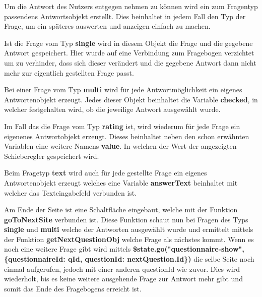 Um die Antwort des Nutzers entgegen nehmen zu können wird ein zum Fragentyp passendens Antwortsobjekt erstellt. Dies beinhaltet in jedem Fall den Typ der Frage, um ein späteres auswerten und anzeigen einfach zu machen.

Ist die Frage vom Typ  \textbf{single} wird in diesem Objekt die Frage und die gegebene Antwort gespeichert. Hier wurde auf eine Verbindung zum Fragebogen verzichtet um zu verhinder, dass sich dieser verändert und die gegebene Antwort dann nicht mehr zur eigentlich gestellten Frage passt.

Bei einer Frage vom Typ \textbf{multi} wird für jede Antwortmöglichkeit ein eigenes Antwortenobjekt erzeugt. Jedes dieser Objekt beinhaltet die Variable \textbf{checked}, in welcher festgehalten wird, ob die jeweilige Antwort ausgewählt wurde.

Im Fall das die Frage vom Typ \textbf{rating} ist, wird wiederum für jede Frage ein eigenenes Antwortobjekt erzeugt. Dieses beinhaltet neben den schon erwähnten Variablen eine weitere Namens \textbf{value}. In welchen der Wert der angezeigten Schieberegler gespeichert wird.

Beim Fragetyp \textbf{text} wird auch für jede gestellte Frage ein eigenes Antwortenobjekt erzeugt welches eine Variable \textbf{answerText} beinhaltet mit welcher das Texteingabefeld verbunden ist.

Am Ende der Seite ist eine Schaltfläche eingebaut, welche mit der Funktion \textbf{goToNextSite} verbunden ist.
Diese Funktion schaut nun bei Fragen des Typs \textbf{single} und \textbf{multi} welche der Antworten ausgewählt wurde und ermittelt mittels der Funktion \textbf{getNextQuestionObj} welche Frage als nächstes kommt. Wenn es noch eine weitere Frage gibt wird mittels \textbf{\$state.go("questionnaire-show",\{questionnaireId: qId, questionId: nextQuestion.Id\})} die selbe Seite noch einmal aufgerufen, jedoch mit einer anderen questionId wie zuvor.
Dies wird wiederholt, bis es keine weitere ausgehende Frage zur Antwort mehr gibt und somit das Ende des Fragebogens erreicht ist.


